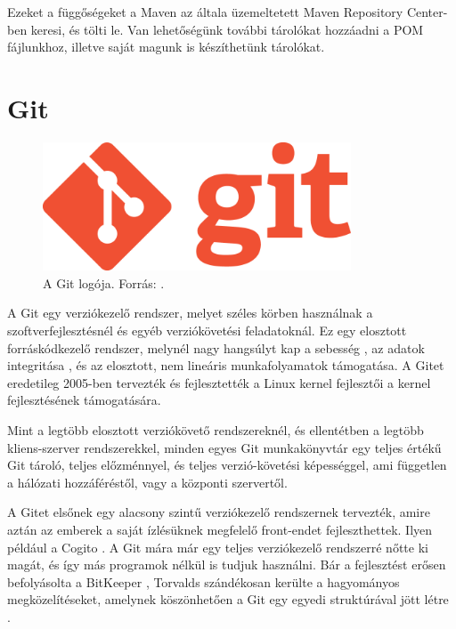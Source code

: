 \documentclass[a4paper,12pt]{report}
\begin{document}
\vspace{2mm}
Ezeket a függőségeket a Maven az általa üzemeltetett Maven Repository Center-ben \cite{mavenrepository} keresi, és tölti le. Van lehetőségünk további tárolókat hozzáadni a POM fájlunkhoz, illetve saját magunk is készíthetünk tárolókat.

\newpage
\section{Git}
\label{git}

\begin{figure}[ht]
\centerline{
\includegraphics[width=3.6in]{img/gitlogo}}
\caption{A Git logója. Forrás: \cite{gitlogo}.}
\label{gitlogo}
\end{figure}

A Git egy verziókezelő rendszer, melyet széles körben használnak a szoftverfejlesztésnél és egyéb verziókövetési feladatoknál. Ez egy elosztott forráskódkezelő rendszer, melynél nagy hangsúlyt kap a sebesség \cite{gitspeed}, az adatok integritása \cite{gitdata}, és az elosztott, nem lineáris munkafolyamatok támogatása. A Gitet eredetileg 2005-ben tervezték és fejlesztették a Linux kernel fejlesztői a kernel fejlesztésének támogatására.

\vspace{2mm}
Mint a legtöbb elosztott verziókövető rendszereknél, és ellentétben a legtöbb kliens-szerver rendszerekkel, minden egyes Git munkakönyvtár egy teljes értékű Git tároló, teljes előzménnyel, és teljes verzió-követési képességgel, ami független a hálózati hozzáféréstől, vagy a központi szervertől.

\vspace{2mm}
A Gitet elsőnek egy alacsony szintű verziókezelő rendszernek tervezték, amire aztán az emberek a saját ízlésüknek megfelelő front-endet fejleszthettek. Ilyen például a Cogito \cite{cogito}. A Git mára már egy teljes verziókezelő rendszerré nőtte ki magát, és így más programok nélkül is tudjuk használni. Bár a fejlesztést erősen befolyásolta a BitKeeper \cite{bitkeeper}, Torvalds szándékosan kerülte a hagyományos megközelítéseket, amelynek köszönhetően a Git egy egyedi struktúrával jött létre \cite{gitunique}.
\end{document}
